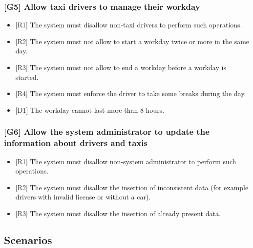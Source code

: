 \documentclass[a4paper,12pt,dvipsnames]{article}%
\begin{document}
\subsubsection{{[}G5{]} Allow taxi drivers to manage their workday}
\begin{itemize}
\item {[}R1{]} The system must disallow non-taxi drivers to perform such operations.
\item {[}R2{]} The system must not allow to start a workday twice or more in the same day.
\item {[}R3{]} The system must not allow to end a workday before a workday is started.
\item {[}R4{]} The system must enforce the driver to take some breaks during the day.
\item {[}D1{]} The workday cannot last more than 8 hours.
\end{itemize}
\label{goal5}
\subsubsection{{[}G6{]} Allow the system administrator to update the information about drivers and taxis}
\begin{itemize}
\item {[}R1{]} The system must disallow non-system administrator to perform such operations.
\item {[}R2{]} The system must disallow the insertion of inconsistent data (for example drivers with invalid license or without a car).
\item {[}R3{]} The system must disallow the insertion of already present data.
\end{itemize} 
\label{goal6}
\subsection{Scenarios}
\end{document}
